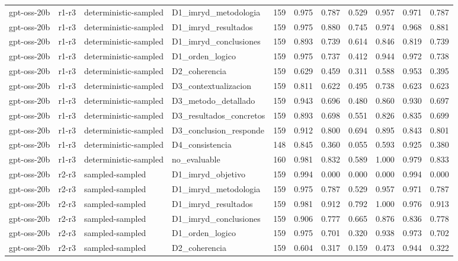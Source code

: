 \begin{table}
\begin{tabular}{llllrrrrrrr}
gpt-oss-20b & r1-r3 & deterministic-sampled & D1\_imryd\_metodologia & 159 & 0.975 & 0.787 & 0.529 & 0.957 & 0.971 & 0.787 \\
gpt-oss-20b & r1-r3 & deterministic-sampled & D1\_imryd\_resultados & 159 & 0.975 & 0.880 & 0.745 & 0.974 & 0.968 & 0.881 \\
gpt-oss-20b & r1-r3 & deterministic-sampled & D1\_imryd\_conclusiones & 159 & 0.893 & 0.739 & 0.614 & 0.846 & 0.819 & 0.739 \\
gpt-oss-20b & r1-r3 & deterministic-sampled & D1\_orden\_logico & 159 & 0.975 & 0.737 & 0.412 & 0.944 & 0.972 & 0.738 \\
gpt-oss-20b & r1-r3 & deterministic-sampled & D2\_coherencia & 159 & 0.629 & 0.459 & 0.311 & 0.588 & 0.953 & 0.395 \\
gpt-oss-20b & r1-r3 & deterministic-sampled & D3\_contextualizacion & 159 & 0.811 & 0.622 & 0.495 & 0.738 & 0.623 & 0.623 \\
gpt-oss-20b & r1-r3 & deterministic-sampled & D3\_metodo\_detallado & 159 & 0.943 & 0.696 & 0.480 & 0.860 & 0.930 & 0.697 \\
gpt-oss-20b & r1-r3 & deterministic-sampled & D3\_resultados\_concretos & 159 & 0.893 & 0.698 & 0.551 & 0.826 & 0.835 & 0.699 \\
gpt-oss-20b & r1-r3 & deterministic-sampled & D3\_conclusion\_responde & 159 & 0.912 & 0.800 & 0.694 & 0.895 & 0.843 & 0.801 \\
gpt-oss-20b & r1-r3 & deterministic-sampled & D4\_consistencia & 148 & 0.845 & 0.360 & 0.055 & 0.593 & 0.925 & 0.380 \\
gpt-oss-20b & r1-r3 & deterministic-sampled & no\_evaluable & 160 & 0.981 & 0.832 & 0.589 & 1.000 & 0.979 & 0.833 \\
gpt-oss-20b & r2-r3 & sampled-sampled & D1\_imryd\_objetivo & 159 & 0.994 & 0.000 & 0.000 & 0.000 & 0.994 & 0.000 \\
gpt-oss-20b & r2-r3 & sampled-sampled & D1\_imryd\_metodologia & 159 & 0.975 & 0.787 & 0.529 & 0.957 & 0.971 & 0.787 \\
gpt-oss-20b & r2-r3 & sampled-sampled & D1\_imryd\_resultados & 159 & 0.981 & 0.912 & 0.792 & 1.000 & 0.976 & 0.913 \\
gpt-oss-20b & r2-r3 & sampled-sampled & D1\_imryd\_conclusiones & 159 & 0.906 & 0.777 & 0.665 & 0.876 & 0.836 & 0.778 \\
gpt-oss-20b & r2-r3 & sampled-sampled & D1\_orden\_logico & 159 & 0.975 & 0.701 & 0.320 & 0.938 & 0.973 & 0.702 \\
gpt-oss-20b & r2-r3 & sampled-sampled & D2\_coherencia & 159 & 0.604 & 0.317 & 0.159 & 0.473 & 0.944 & 0.322 \\

\end{tabular}
\end{table}
